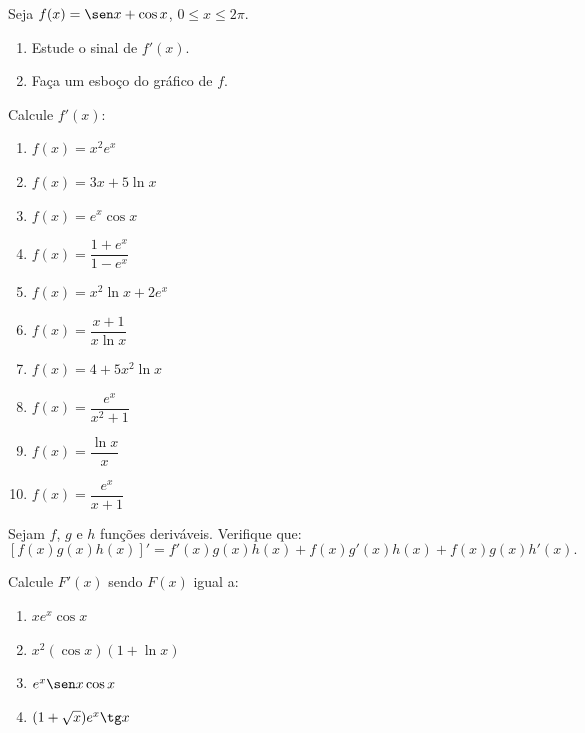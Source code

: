 \begin{exercicio}[11]
Seja $f(x) = \sen x + \cos x$, $0 \le x \le 2\pi$.
\begin{enumerate}[label=\alph*)]
    \item Estude o sinal de $f'(x)$.
    \item Faça um esboço do gráfico de $f$.
\end{enumerate}
\end{exercicio}

\begin{exercicio}[12]
Calcule $f'(x)$:
\begin{enumerate}[label=\alph*)]
    \item $f(x) = x^2 e^x$
    \item $f(x) = 3x + 5\ln x$
    \item $f(x) = e^x \cos x$
    \item $f(x) = \dfrac{1 + e^x}{1 - e^x}$
    \item $f(x) = x^2 \ln x + 2e^x$
    \item $f(x) = \dfrac{x + 1}{x\ln x}$
    \item $f(x) = 4 + 5x^2 \ln x$
    \item $f(x) = \dfrac{e^x}{x^2 + 1}$
    \item $f(x) = \dfrac{\ln x}{x}$
    \item $f(x) = \dfrac{e^x}{x + 1}$
\end{enumerate}
\end{exercicio}

\begin{exercicio}[13]
Sejam $f$, $g$ e $h$ funções deriváveis. Verifique que:
\[
[f(x)g(x)h(x)]' = f'(x)g(x)h(x) + f(x)g'(x)h(x) + f(x)g(x)h'(x).
\]
\end{exercicio}

\begin{exercicio}[14]
Calcule $F'(x)$ sendo $F(x)$ igual a:
\begin{enumerate}[label=\alph*)]
    \item $x e^x \cos x$
    \item $x^2 (\cos x)(1 + \ln x)$
    \item $e^x \sen x \cos x$
    \item $(1 + \sqrt{x})e^x \tg x$
\end{enumerate}
\end{exercicio}

\clearpage


